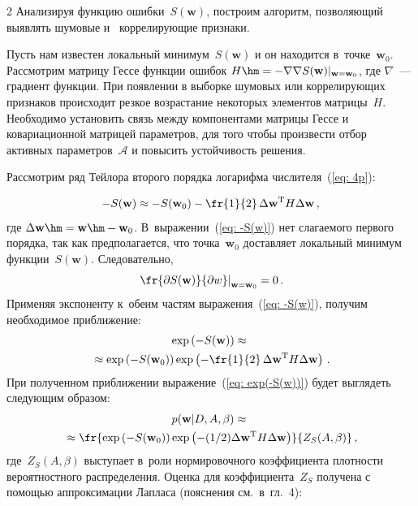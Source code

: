 \begin{multicols}{2}
Анализируя функцию ошибки~$S(\mathbf{w})$, построим алгоритм, позволяющий 
выявлять шумовые и~ коррелирующие признаки.

Пусть нам известен локальный минимум~$S(\mathbf{w})$ и он находится
в~точке~$\mathbf{w}_0$. Рассмотрим матрицу Гессе функции ошибок 
$H\hm= - \nabla \nabla S(\mathbf{w})|_{\mathbf{w=w}_0}$, где $\nabla$~---
градиент функции. При появлении в выборке шумовых или коррелирующих
признаков происходит резкое возрастание некоторых элементов
матрицы~$H$. Необходимо установить связь между компонентами матрицы
Гессе и~ ковариационной матрицей параметров, для того чтобы
произвести отбор активных параметров~$\mathcal{A}$ и повысить
устойчивость решения.

Рассмотрим ряд Тейлора второго порядка логарифма числителя~(\ref{eq: 4p}):

\noindent
\begin{equation}
\label {eq: -S(w)}
-S(\mathbf{w}) \approx -S(\mathbf{w}_0)-\fr{1}{2}\,\Delta\mathbf{w}^{\mathrm{T}}H\Delta\mathbf{w}\,,
\end{equation}
где $\Delta\mathbf{w}\hm=\mathbf{w}\hm-\mathbf{w}_0$.
В~выражении~(\ref{eq: -S(w)}) нет сла\-га\-емо\-го первого порядка, так
как предполагается, что точка~$\mathbf{w}_0$ доставляет локальный
минимум функции~$S(\mathbf{w})$. Следовательно,
$$
\left. \fr{\partial S(\mathbf{w})}{\partial w} \right|_{\mathbf{w} = \mathbf{w}_0}  = 0\,.
$$
Применяя экспоненту к~обеим частям выражения~(\ref{eq: -S(w)}), получим необходимое приближение:
\begin{multline}
\label {eq: exp(-S(w))}
\exp\left(-S(\mathbf{w})\right) \approx {}\\
{}\approx\exp\left(-S(\mathbf{w}_0)\right)
\exp\left(-\fr{1}{2}\,\Delta\mathbf{w}^{\mathrm{T}}H\Delta\mathbf{w}\right)\,.
\end{multline}
При полученном приближении выражение~(\ref{eq: exp(-S(w))}) будет выглядеть следующим образом:
\begin{multline}
\label {eq: p(w|D,A,B)}
p(\mathbf{w}|D,A,\beta) \approx{}\\
{}\approx \fr{\exp\left(-S(\mathbf{w}_0)\right)
\exp\left(-({1}/{2})\Delta\mathbf{w}^{\mathrm{T}}H\Delta\mathbf{w}\right)}{Z_{S}(A,\beta)}\,,
\end{multline}
где~$Z_S(A,\beta)$ выступает в~роли нормировочного коэффициента
плотности вероятностного распределения. Оценка для
коэффициента~$Z_S$ получена с помощью аппроксимации Лапласа
(пояснения см.\ в~гл.~4):
\begin{equation}
\label {eq: ZS}

\end{equation}
\end{multicols}
